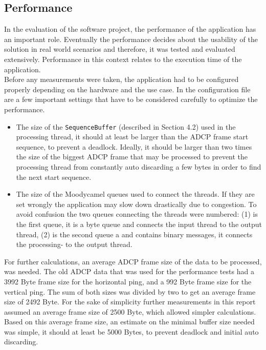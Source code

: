 \subsection{Performance}
In the evaluation of the software project, the performance of the application has an important role. Eventually the performance decides about the usability of the solution in real world scenarios and therefore, it was tested and evaluated extensively. Performance in this context relates to the execution time of the application.\\
Before any measurements were taken, the application had to be configured properly depending on the hardware and the use case. In the configuration file are a few important settings that have to be considered carefully to optimize the performance.
\begin{itemize}
\item The size of the \texttt{SequenceBuffer} (described in Section 4.2) used in the processing thread, it should at least be larger than the ADCP frame start sequence, to prevent a deadlock. Ideally, it should be larger than two times the size of the biggest ADCP frame that may be processed to prevent the processing thread from constantly auto discarding a few bytes in order to find the next start sequence.
\item The size of the Moodycamel queues used to connect the threads. If they are set wrongly the application may slow down drastically due to congestion. To avoid confusion the two queues connecting the threads were numbered: (1) is the first queue, it is a byte queue and connects the input thread to the output thread, (2) is the second queue a and contains binary messages, it connects the processing- to the output thread.
\end{itemize}

For further calculations, an average ADCP frame size of the data to be processed, was needed. The old ADCP data that was used for the performance tests had a 3992 Byte frame size for the horizontal ping, and a 992 Byte frame size for the vertical ping. The sum of both sizes was divided by two to get an average frame size of 2492 Byte. For the sake of simplicity further measurements in this report assumed an average frame size of 2500 Byte, which allowed simpler calculations.\\
Based on this average frame size, an estimate on the minimal buffer size needed was simple, it should at least be 5000 Bytes, to prevent deadlock and initial auto discarding.

